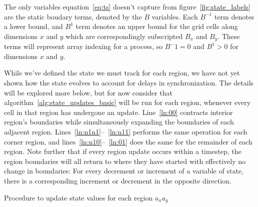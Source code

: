 The only variables equation~\eqref{eq:ts} doesn't capture from figure~\ref{fig:state_labels} are the
static boudary terms, denoted by the $B$ variables.  Each $B^{-1}$ term denotes a lower bound, and $B^1$
 term
denotes an upper bound for the grid cells along dimensions $x$ and $y$ which are
correspondingly subscripted $B_x$ and $B_y$.
  These terms will represent array indexing for a process, so $B^-1 = 0$ and $B^1 > 0$
  for dimensions $x$ and $y$.

  While we've defined the state we must track for each region,
we have not yet shown how the state evolves to account for delays in synchronization.
The details will be explored more
  below, but for now consider that algorithm~\ref{alg:state_updates_basic} will
 be run for each region, whenever every cell in that region has
 undergone an update.
 Line~\ref{ln:00} contracts interior region's boundaries
 while simultaneously expanding the boundaries of each adjacent region.
 Lines~\ref{ln:n1n1}--~\ref{ln:n11} performs the same operation for each corner
 region, and lines~\ref{ln:n10}--~\ref{ln:01} does the same for the remainder of
 each region.  Note further that if every region update occurs within a
 timestep, the region boundaries will all return to where they have started with
 effectively no change in boundaries:  For every decrement or increment of a
 variable of state, there is a corresponding increment or decrement
 in the opposite direction.

\begin{algorithm}[h]
  \setcounter{AlgoLine}{0}
  \caption{Procedure to update state values for each region $a_xa_y$}
  \label{alg:state_updates_basic}
\end{algorithm}

